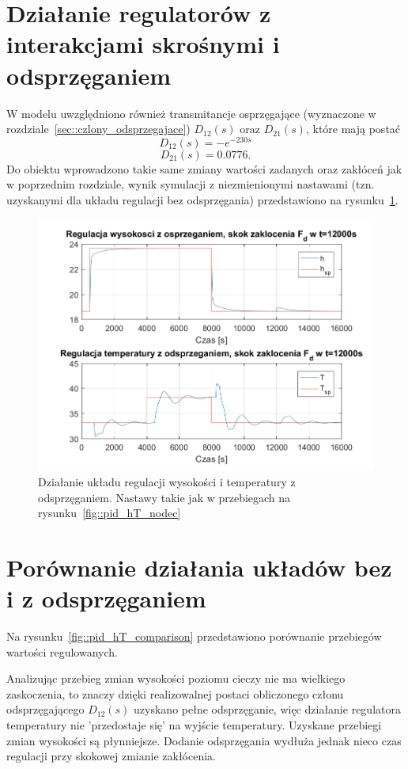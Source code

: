 \documentclass{article}
\begin{document}
\section{Działanie regulatorów z interakcjami skrośnymi i odsprzęganiem}
\label{sec::decoupling}
W modelu uwzględniono również transmitancje osprzęgające (wyznaczone w rozdziale~\ref{sec::czlony_odsprzegajace}) $D_{12}(s)$ oraz $D_{21}(s)$, które mają postać
\[
D_{12}(s) =  -e^{-230s}
\]
\[
D_{21}(s) = 0.0776.
\]
Do obiektu wprowadzono takie same zmiany wartości zadanych oraz zakłóceń jak w poprzednim rozdziale, wynik symulacji z niezmienionymi nastawami (tzn. uzyskanymi dla układu regulacji bez odsprzęgania) przedstawiono na rysunku~\ref{fig::pid_hT_dec}.
\begin{figure}[htb]
	\centering
	\includegraphics[width=\textwidth]{pid_hT_dec.PNG}
	\caption{Działanie układu regulacji wysokości i temperatury z odsprzęganiem. Nastawy takie jak w przebiegach na rysunku~\ref{fig::pid_hT_nodec}}
	\label{fig::pid_hT_dec}
\end{figure}

\newpage
\section{Porównanie działania układów bez i z odsprzęganiem}
Na rysunku~\ref{fig::pid_hT_comparison} przedstawiono porównanie przebiegów wartości regulowanych.

Analizując przebieg zmian wysokości poziomu cieczy nie ma wielkiego zaskoczenia, to znaczy dzięki realizowalnej postaci obliczonego członu odsprzęgającego $D_{12}(s)$ uzyskano pełne odsprzęganie, więc działanie regulatora temperatury nie 'przedostaje się' na wyjście temperatury. Uzyskane przebiegi zmian wysokości są płynniejsze. Dodanie odsprzęgania wydłuża jednak nieco czas regulacji przy skokowej zmianie zakłócenia.
\end{document}
